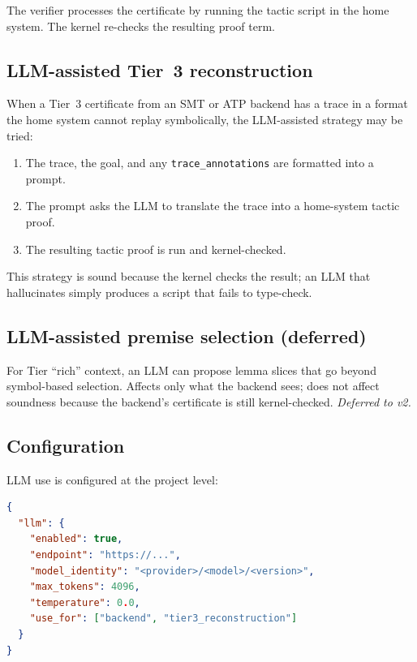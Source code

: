 \documentclass[11pt,letterpaper]{article}
\theoremstyle{definition}
\theoremstyle{remark}
\begin{document}
The verifier processes the certificate by running the tactic script in
the home system. The kernel re-checks the resulting proof term.

\subsection{LLM-assisted Tier~3 reconstruction}

When a Tier~3 certificate from an SMT or ATP backend has a trace in a
format the home system cannot replay symbolically, the LLM-assisted
strategy may be tried:

\begin{enumerate}[leftmargin=2em]
  \item The trace, the goal, and any \texttt{trace\_annotations} are
        formatted into a prompt.
  \item The prompt asks the LLM to translate the trace into a
        home-system tactic proof.
  \item The resulting tactic proof is run and kernel-checked.
\end{enumerate}

This strategy is sound because the kernel checks the result; an LLM
that hallucinates simply produces a script that fails to type-check.

\subsection{LLM-assisted premise selection (deferred)}

For Tier ``rich'' context, an LLM can propose lemma slices that go
beyond symbol-based selection. Affects only what the backend sees;
does not affect soundness because the backend's certificate is still
kernel-checked. \emph{Deferred to v2.}

\subsection{Configuration}

LLM use is configured at the project level:

\begin{lstlisting}[language=json]
{
  "llm": {
    "enabled": true,
    "endpoint": "https://...",
    "model_identity": "<provider>/<model>/<version>",
    "max_tokens": 4096,
    "temperature": 0.0,
    "use_for": ["backend", "tier3_reconstruction"]
  }
}
\end{lstlisting}
\end{document}
